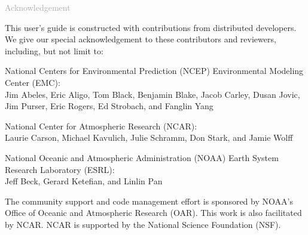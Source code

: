 \begin{titlepage}
\vspace*{0.5cm}
\noindent

\begin{flushleft}
\textcolor{darkgray}{\LARGE Acknowledgement}
\vspace*{1cm}\par

This user's guide is constructed with contributions from distributed developers. We give our special acknowledgement to these contributors and reviewers, including, but not limit to:

National Centers for Environmental Prediction (NCEP) Environmental Modeling Center (EMC): \\
Jim Abeles, Eric Aligo, Tom Black, Benjamin Blake, Jacob Carley, Dusan Jovic, Jim Purser, Eric Rogers, Ed Strobach, and Fanglin Yang

National Center for Atmospheric Research (NCAR): \\
Laurie Carson, Michael Kavulich, Julie Schramm, Don Stark, and Jamie Wolff  

National Oceanic and Atmospheric Administration (NOAA) Earth System Research Laboratory (ESRL): \\
Jeff Beck, Gerard Ketefian, and Linlin Pan

The community support and code management effort is sponsored by NOAA's Office of Oceanic and Atmospheric Research (OAR). This work is also facilitated by NCAR. NCAR is supported by the National Science Foundation (NSF).

\end{flushleft}
\end{titlepage}
\pagebreak{}